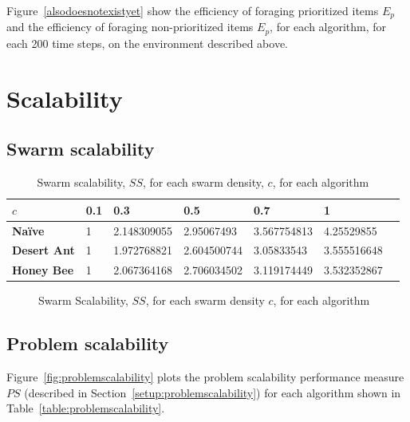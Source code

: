 Figure~\ref{alsodoesnotexistyet} show the efficiency of foraging prioritized items $E_p$ and the efficiency of foraging non-prioritized items $E_p$, for each algorithm, for each 200 time steps, on the environment described above. 

\section{Scalability}
\label{results:scalability}

\subsection{Swarm scalability}
\begin{table}[]
\centering
\caption{Swarm scalability, $SS$, for each swarm density, $c$, for each algorithm}
\label{table:swarmscalability}
\begin{tabular}{@{}lllllll@{}}
\toprule
\textbf{$c$}            & \textbf{0.1} & \textbf{0.3}         & \textbf{0.5}         & \textbf{0.7}         & \textbf{1}           \\ \midrule
\textbf{Na\"ive}    & 1   & 2.148309055 & 2.95067493  & 3.567754813 & 4.25529855  \\
\textbf{Desert Ant} & 1   & 1.972768821 & 2.604500744 & 3.05833543  & 3.555516648 \\
\textbf{Honey Bee}  & 1   & 2.067364168 & 2.706034502 & 3.119174449 & 3.532352867 \\ \bottomrule
\end{tabular}
\end{table}

\begin{figure}[!htb]
\centering
\small
\resizebox{\textwidth}{!}{}
\caption{Swarm Scalability, $SS$, for each swarm density $c$, for each algorithm}
\label{fig:swarmscalability}
\end{figure}


\subsection{Problem scalability}

Figure~\ref{fig:problemscalability} plots the problem scalability performance measure $PS$ (described in Section~\ref{setup:problemscalability}) for each algorithm shown in Table~\ref{table:problemscalability}. 

